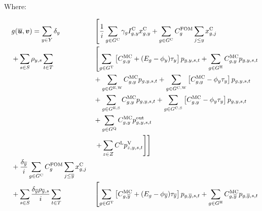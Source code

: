 \documentclass{article}
\begin{document}
Where:

\begin{alignat}{3}
	& && g(\bm{\overline{u}}, \bm{v}) = \sum\limits_{\iYear \in \sYears} \cDiscountRate  &&  \left[\frac{1}{\cInterestRate} \sum\limits_{g\in \sGeneratorsCandidate} \cAmortisationRate  \cCandidateInvestmentCost \vInstalledCapacity + \sum\limits_{\iGenerator \in \sGeneratorsCandidate} \cFixedOperationsMaintenanceCostGenerator \sum\limits_{\iYearAlias \leq \iYear} \vInstalledCapacity[\iGenerator,\iYearAlias] \right. \nonumber\\ 
	& && + \sum\limits_{\iScenario \in \sScenarios} \cScenarioDuration \sum\limits_{\iInterval \in \sIntervals} && \left[\sum\limits_{\iGenerator \in \sGeneratorsThermal} \left[\cMarginalCost + (\cEmissionsIntensity - \vBaseline)\vPermitPrice\right]\vPower  + \sum\limits_{\iGenerator \in \sGeneratorsHydro}\cMarginalCost \vPower \right. \nonumber\\
	& && && + \sum\limits_{\iGenerator \in \sGeneratorsExistingWind} \cMarginalCost \vPower + \sum\limits_{\iGenerator \in \sGeneratorsCandidateWind} \left[\cMarginalCost - \vBaseline \vPermitPrice\right] \vPower \nonumber\\
	& && && + \sum\limits_{\iGenerator \in \sGeneratorsExistingSolar} \cMarginalCost \vPower + \sum\limits_{\iGenerator \in \sGeneratorsCandidateSolar} \left[\cMarginalCost - \vBaseline\vPermitPrice\right] \vPower\nonumber\\
	& && && + \sum\limits_{\iGenerator \in \sStorage} \cMarginalCost \vPowerOut \nonumber\\
	& && && \left.\left. + \sum\limits_{\iZone \in \sZones} \cLostLoadCost \vLostLoadPower \right]\right] \nonumber\\
	& && + \frac{\cDiscountRate[\iYearTerminal]}{\cInterestRate}\sum\limits_{\iGenerator \in \sGeneratorsCandidate} \cFixedOperationsMaintenanceCostGenerator \sum\limits_{\iYearAlias \leq \iYearTerminal} \vInstalledCapacity[\iGenerator,\iYearAlias] \nonumber\\
	& && + \sum\limits_{\iScenario \in \sScenarios} \frac{\cDiscountRate[\iYearTerminal]\cScenarioDuration[\iYearTerminal,\iScenario]}{\cInterestRate} \sum\limits_{\iInterval \in \sIntervals} && \left[\sum\limits_{\iGenerator \in \sGeneratorsThermal} \left[\cMarginalCost[\iGenerator,\iYearTerminal] + (\cEmissionsIntensity - \vBaseline[\iYearTerminal])\vPermitPrice[\iYearTerminal]\right]\vPower[\iGenerator,\iYearTerminal,\iScenario,\iInterval]  + \sum\limits_{\iGenerator \in \sGeneratorsHydro}\cMarginalCost[\iGenerator,\iYearTerminal] \vPower[\iGenerator,\iYearTerminal,\iScenario,\iInterval] \right. \nonumber\\

\end{alignat}
\end{document}
